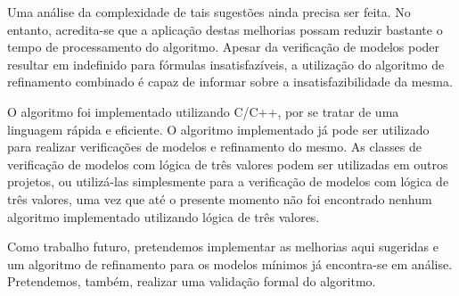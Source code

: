 \documentclass[normaltoc,capchap,capsec,times]{abnt}
\begin{document}
Uma análise da complexidade de tais sugestões ainda precisa ser feita. No entanto, acredita-se que a aplicação destas melhorias possam reduzir bastante o tempo de processamento do algoritmo. Apesar da verificação de modelos poder resultar em indefinido para fórmulas insatisfazíveis, a utilização do algoritmo de refinamento combinado é capaz de informar sobre a insatisfazibilidade da mesma.

O algoritmo foi implementado utilizando C/C++, por se tratar de uma linguagem rápida e eficiente. O algoritmo implementado já pode ser utilizado para realizar verificações de modelos e refinamento do mesmo. As classes de verificação de modelos com lógica de três valores podem ser utilizadas em outros projetos, ou utilizá-las simplesmente para a verificação de modelos com lógica de três valores, uma vez que até o presente momento não foi encontrado nenhum algoritmo implementado utilizando lógica de três valores. 

Como trabalho futuro, pretendemos implementar as melhorias aqui sugeridas e um algoritmo de refinamento para os modelos mínimos já encontra-se em análise. Pretendemos, também, realizar uma validação formal do algoritmo. %

%
%

\end{document}
